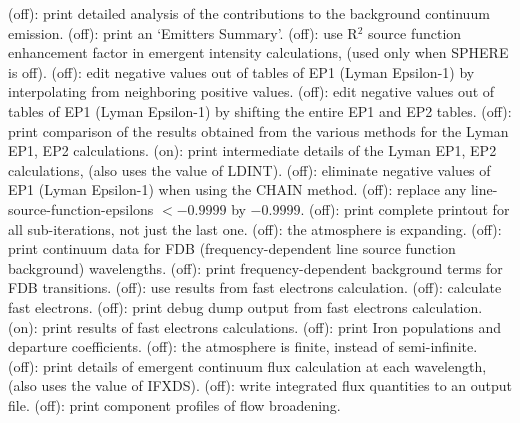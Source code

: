\space \vbox { (off): \bang
print detailed analysis of the contributions to the background continuum
emission.}
\space \vbox { (off): \bang
print an `Emitters Summary'.}
\space \vbox { (off): \bang
use R$^2$ source function enhancement factor in emergent intensity 
calculations, (used only when SPHERE is off).}
\space \vbox { (off): \bang
edit negative values out of tables of EP1 (Lyman Epsilon-1) by 
interpolating from neighboring positive values.}
\space \vbox { (off): \bang
edit negative values out of tables of EP1 (Lyman Epsilon-1) by 
shifting the \break entire EP1 and EP2 tables.}
\space \vbox { (off): \bang
print comparison of the results obtained from the various methods for the
\break Lyman EP1, EP2 calculations.}
\space \vbox { (on): \bang
print intermediate details of the Lyman EP1, EP2 calculations,
(also uses the value of LDINT).}
\space \vbox { (off): \bang
eliminate negative values of EP1 (Lyman Epsilon-1) when using the CHAIN
method.}
\space \vbox { (off): \bang
replace any line-source-function-epsilons $< -0.9999$ by $-0.9999$.}
\space \vbox { (off): \bang
print complete printout for all sub-iterations, not just the last one.}
\space \vbox { (off): \bang
the atmosphere is expanding.}
\space \vbox { (off): \bang
print continuum data for FDB (frequency-dependent line source function
background) wavelengths.}
\space \vbox { (off): \bang
print frequency-dependent background terms for FDB transitions.}
\space \vbox { (off): \bang
use results from fast electrons calculation.}
\space \vbox { (off): \bang
calculate fast electrons.}
\space \vbox { (off): \bang
print debug dump output from fast electrons calculation.}
\space \vbox { (on): \bang
print results of fast electrons calculations.}
\space \vbox { (off): \bang
print Iron populations and departure coefficients.}
\space \vbox { (off): \bang
the atmosphere is finite, instead of semi-infinite.}
\space \vbox { (off): \bang
print details of emergent continuum flux calculation at each wavelength, (also
uses the value of IFXDS).}
\space \vbox { (off): \bang
write integrated flux quantities to an output file.}
\space \vbox { (off): \bang
print component profiles of flow broadening.}
